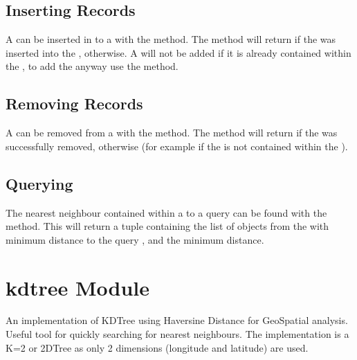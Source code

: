 \documentclass[letterpaper,10pt,english]{sphinxmanual}
\begin{document}
\subsection{Inserting Records}
\label{\detokenize{kdtree:inserting-records}}
\sphinxAtStartPar
A  can be inserted in to a  with the  method. The method will return  if
the  was inserted into the ,  otherwise. A  will not be added if it is already
contained within the , to add the  anyway use the  method.


\subsection{Removing Records}
\label{\detokenize{kdtree:removing-records}}
\sphinxAtStartPar
A  can be removed from a  with the  method. The method will return  if the
 was successfully removed,  otherwise (for example if the  is not contained within the
).


\subsection{Querying}
\label{\detokenize{kdtree:querying}}
\sphinxAtStartPar
The nearest neighbour  contained within a  to a query  can be found with the
 method. This will return a tuple containing the list of  objects from the  with
minimum distance to the query , and the minimum distance.


\section{kdtree Module}
\label{\detokenize{kdtree:module-geotrees.kdtree}}\label{\detokenize{kdtree:kdtree-module}}
\sphinxAtStartPar
An implementation of KDTree using Haversine Distance for GeoSpatial analysis.
Useful tool for quickly searching for nearest neighbours. The implementation is
a K=2 or 2DTree as only 2 dimensions (longitude and latitude) are used.
\end{document}
